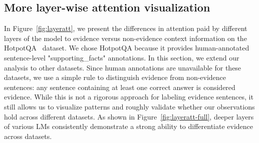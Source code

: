 \subsection{More layer-wise attention visualization}\label{sec:apd-res-attlayer}
In Figure~\ref{fig:layeratt}, we present the differences in attention paid by different layers of the model to evidence versus non-evidence context information on the HotpotQA~\cite{yang2018hotpotqa} dataset. We chose HotpotQA because it provides human-annotated sentence-level "supporting\_facts" annotations.
In this section, we extend our analysis to other datasets. Since human annotations are unavailable for these datasets, we use a simple rule to distinguish evidence from non-evidence sentences: any sentence containing at least one correct answer is considered evidence. While this is not a rigorous approach for labeling evidence sentences, it still allows us to visualize patterns and roughly validate whether our observations hold across different datasets.
As shown in Figure~\ref{fig:layeratt-full}, deeper layers of various LMs consistently demonstrate a strong ability to differentiate evidence across datasets.

\begin{table}[h]
\centering
\caption{Sentence-level versus token-level eliciting.}
\label{tab:sent-vs-token}
\vspace{-10pt}
\vspace{-10pt}
\end{table}

